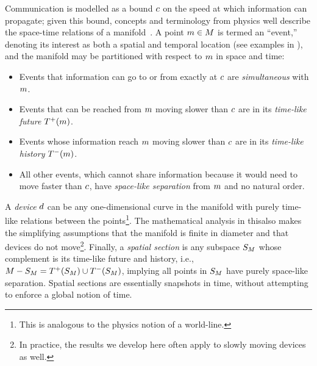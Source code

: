 \documentclass[12pt,a4paper,twoside,openright]{book}
\begin{document}
Communication is modelled as a bound $c$ on the speed at which information can propagate; given this bound, concepts and terminology from physics well describe the space-time relations of a manifold~\cite{RelativityIntroduction}.
%
A point $m \in M$ is termed an ``event,'' denoting its interest as both a spatial and temporal location (see examples in ), and the manifold may be partitioned with respect to $m$ in space and time:
\begin{itemize}
\item Events that information can go to or from exactly at $c$ are {\em simultaneous} with $m$.
\item Events that can be reached from $m$ moving slower than $c$ are in its {\em time-like future} $T^+({m})$.
\item Events whose information reach $m$ moving slower than $c$ are in its {\em time-like history} $T^-({m})$.
\item All other events, which cannot share information because it would need to move faster than $c$, have {\em space-like separation} from $m$ and no natural order.
\end{itemize}

A {\em device} $d$ can be any one-dimensional curve in the manifold with purely time-like relations between the points\footnote{This is analogous to the physics notion of a world-line.}.
%
The mathematical analysis in this\levelText{}also makes the simplifying assumptions that the manifold is finite in diameter and that devices do not move\footnote{In practice, the results we develop here often apply to slowly moving devices as well.}.
%
Finally, a {\em spatial section} is any subspace $S_{M}$ whose complement is its time-like future and history, i.e., $M-S_{M} = T^+({S_{M}}) \cup T^-({S_{M}})$, implying all points in $S_{M}$ have purely space-like separation.  
%
Spatial sections are essentially snapshots in time, without attempting to enforce a global notion of time.
\end{document}
